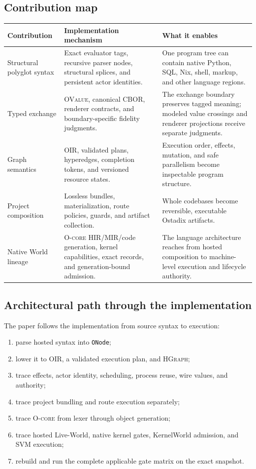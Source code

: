 \documentclass[11pt,oneside]{article}
\newcommand{\ovalue}{\textsc{OValue}}
\newcommand{\oir}{\textsc{OIR}}
\newcommand{\hgraph}{\textsc{HGraph}}
\newcommand{\ocore}{\textsc{O-core}}
\begin{document}
\subsection{Contribution map}

\begin{longtable}{P{0.20\textwidth} P{0.36\textwidth} P{0.36\textwidth}}
\toprule
\textbf{Contribution} & \textbf{Implementation mechanism} & \textbf{What it enables} \\
\midrule
\endhead
Structural polyglot syntax &
Exact evaluator tags, recursive parser nodes, structural splices, and
persistent actor identities. &
One program tree can contain native Python, SQL, Nix, shell, markup, and other
language regions. \\
Typed exchange &
\ovalue{}, canonical CBOR, renderer contracts, and boundary-specific fidelity
judgments. &
The exchange boundary preserves tagged meaning; modeled value crossings and
renderer projections receive separate judgments. \\
Graph semantics &
\oir{}, validated plans, hyperedges, completion tokens, and versioned resource
states. &
Execution order, effects, mutation, and safe parallelism become inspectable
program structure. \\
Project composition &
Lossless bundles, materialization, route policies, guards, and artifact
collection. &
Whole codebases become reversible, executable Ostadix artifacts. \\
Native World lineage &
\ocore{} HIR/MIR/code generation, kernel capabilities, exact records, and
generation-bound admission. &
The language architecture reaches from hosted composition to machine-level
execution and lifecycle authority. \\
\bottomrule
\end{longtable}

\subsection{Architectural path through the implementation}

The paper follows the implementation from source syntax to execution:

\begin{enumerate}
  \item parse hosted syntax into \texttt{ONode};
  \item lower it to \oir{}, a validated execution plan, and \hgraph{};
  \item trace effects, actor identity, scheduling, process reuse, wire values,
        and authority;
  \item trace project bundling and route execution separately;
  \item trace \ocore{} from lexer through object generation;
  \item trace hosted Live-World, native kernel gates, KernelWorld admission,
        and SVM execution;
  \item rebuild and run the complete applicable gate matrix on the exact snapshot.
\end{enumerate}
\end{document}
